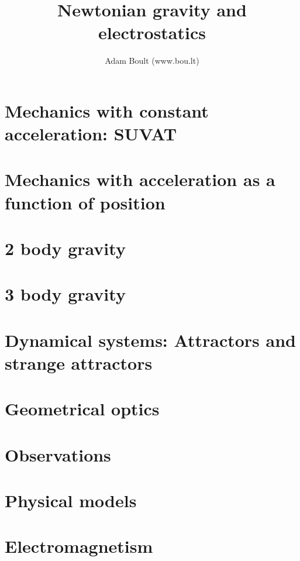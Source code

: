 \documentclass[oneside]{book}
\begin{document}
\author{Adam Boult (www.bou.lt)}
\title{Newtonian gravity and electrostatics}
\maketitle

\setcounter{tocdepth}{0}
\tableofcontents



\part{Mechanics with constant acceleration: SUVAT}


\part{Mechanics with acceleration as a function of position}



\part{2 body gravity}


\part{3 body gravity}

\part{Dynamical systems: Attractors and strange attractors}

\part{Geometrical optics}

\part{Observations}

\part{Physical models}





\part{Electromagnetism}

\end{document}
